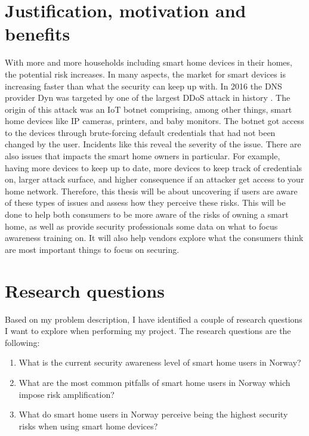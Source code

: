\section{Justification, motivation and benefits}
With more and more households including smart home devices in their homes, the potential risk increases. In many aspects, the market for smart devices is increasing faster than what the security can keep up with. In 2016 the DNS provider Dyn was targeted by one of the largest DDoS attack in history \cite{wiki:Dyn}. The origin of this attack was an IoT botnet comprising, among other things, smart home devices like IP cameras, printers, and baby monitors. The botnet got access to the devices through brute-forcing default credentials that had not been changed by the user. Incidents like this reveal the severity of the issue. There are also issues that impacts the smart home owners in particular. For example, having more devices to keep up to date, more devices to keep track of credentials on, larger attack surface, and higher consequence if an attacker get access to your home network. Therefore, this thesis will be about uncovering if users are aware of these types of issues and assess how they perceive these risks. This will be done to help both consumers to be more aware of the risks of owning a smart home, as well as provide security professionals some data on what to focus awareness training on. It will also help vendors explore what the consumers think are most important things to focus on securing. 

\section{Research questions}
\label{research:questions}
Based on my problem description, I have identified a couple of research questions I want to explore when performing my project. The research questions are the following: 
\begin{enumerate}
    \item What is the current security awareness level of smart home users in Norway?
    \item What are the most common pitfalls of smart home users in Norway which impose risk amplification?
    \item What do smart home users in Norway perceive being the highest security risks when using smart home devices?
\end{enumerate}

